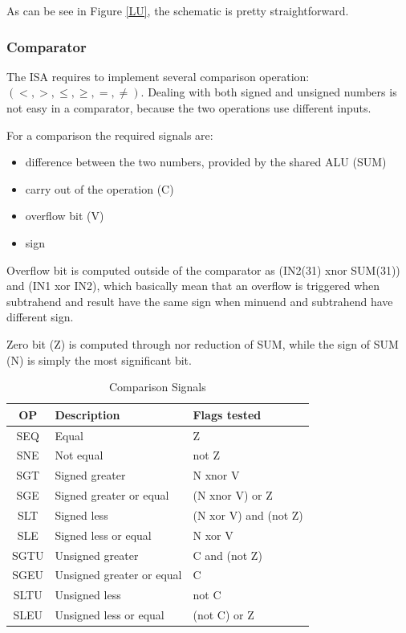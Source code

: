 \documentclass[12pt]{article}
\begin{document}
As can be see in Figure \ref{LU}, the schematic is pretty straightforward.


\subsubsection{Comparator}
The ISA requires to implement several comparison operation: $(<, >, \leq, \geq, =, \neq)$.
Dealing with both signed and unsigned numbers is not easy in a comparator, because the two operations use different inputs.

For a comparison the required signals are:
\begin{itemize}
	\item difference between the two numbers, provided by the shared ALU (SUM)
	\item carry out of the operation (C)
	\item overflow bit (V)
	\item sign
\end{itemize}
Overflow bit is computed outside of the comparator as (IN2(31) xnor SUM(31)) and (IN1 xor IN2),
which basically mean that an overflow is triggered when subtrahend and result have the same sign when minuend and subtrahend have different sign.

Zero bit (Z) is computed through nor reduction of SUM, while the sign of SUM (N) is simply the most significant bit.
\begin{table}
\begin{center}
	\begin{tabular}{ | c | l | l |}
		\hline
		\rowcolor{LimeGreen} OP & Description & Flags tested \\ \hline
		SEQ & Equal & Z \\ \hline
		SNE & Not equal &  not Z \\ \hline
		SGT & Signed greater & N xnor V \\ \hline
		SGE & Signed greater or equal & (N  xnor  V) or Z \\ \hline
		SLT & Signed less & (N xor V) and (not Z)\\ \hline
		SLE & Signed less or equal & N xor V \\ \hline
		SGTU & Unsigned greater & C and (not Z) \\ \hline
		SGEU & Unsigned greater or equal & C \\ \hline
		SLTU & Unsigned less & not C \\ \hline
		SLEU & Unsigned less or equal & (not C) or Z  \\ \hline
	\end{tabular}
		\caption{Comparison Signals}
		\label{COMPA}
\end{center}
\end{table}
\end{document}

